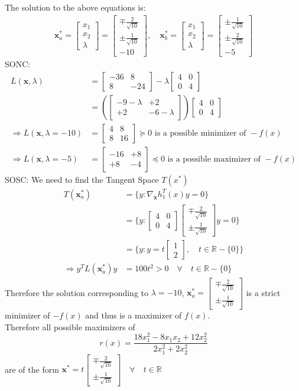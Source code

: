 \documentclass[a4paper,11pt]{article}
\newcommand{\V}[1]{\boldsymbol{#1}}
\newcommand{\mat}[1]{\begin{bmatrix}#1\end{bmatrix}}
\begin{document}
The solution to the above equations is:
\begin{align*}
 \V{x}^*_a = \mat{x_1\\x_2\\\lambda}=\mat{\mp\frac{2}{\sqrt{10}} \\ \pm\frac{1}{\sqrt{10}}\\-10},\quad 
 \V{x}^*_b =\mat{x_1\\x_2\\\lambda}=\mat{\pm\frac{1}{\sqrt{10}} \\ \pm\frac{2}{\sqrt{10}}\\-5}
\end{align*}
SONC:
\begin{align*}
 L(\V{x},\lambda) &=\mat{-36& 8\\8& -24} -\lambda\mat{4&0\\0&4}\\
 & = (\mat{-9-\lambda& +2\\+2& -6-\lambda})\mat{4&0\\0&4}\\
 \Rightarrow L(\V{x},\lambda=-10) &= \mat{4& 8\\8& 16} \succcurlyeq 0 \text{ is a possible minimizer of } -f(x)\\
 \Rightarrow L(\V{x},\lambda=-5) &= \mat{-16& +8\\+8& -4}\preccurlyeq 0 \text{ is a possible maximizer of } -f(x)
\end{align*}
SOSC: We need to find the Tangent Space $T(x^*)$
\begin{align*}
T(\V{x}^*_a) & = \{y: \nabla_{\V{x}}h_1^T(x)y = 0   \}\\
& = \{y: \mat{4&0\\0&4}\mat{\mp\frac{2}{\sqrt{10}} \\ \pm\frac{1}{\sqrt{10}}}y = 0   \}\\
&=\{y: y = t\mat{1\\2},\quad t\in\mathbb{R}-\{0\}\}\\
\Rightarrow y^TL(\V{x}^*_a)y &= 100t^2 > 0 \quad \forall \quad t\in\mathbb{R}-\{0\}
\end{align*}
Therefore the solution corresponding to $\lambda=-10$, $\V{x}^*_a =\mat{\mp\frac{2}{\sqrt{10}} \\ \pm\frac{1}{\sqrt{10}}}$ is a strict minimizer of $-f(x)$ and thus is a maximizer of $f(x)$.\\ 

\noindent Therefore all possible maximizers of $$r(x) = \frac{18x_1^2 - 8x_1x_2 +12x_2^2}{2x_1^2 + 2x_2^2}$$
are of the form $\V{x}^* =t\mat{\mp\frac{2}{\sqrt{10}} \\ \pm\frac{1}{\sqrt{10}}} \quad \forall \quad t \in \mathbb{R}$
\end{document}
